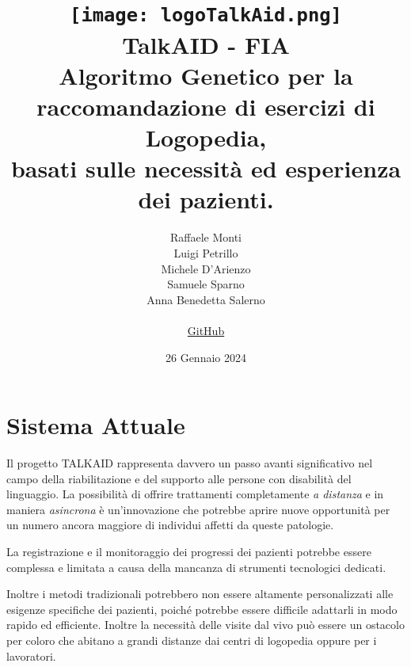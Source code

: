 \documentclass{article}
\begin{document}
    \title{
    \texttt{[image: logoTalkAid.png]} \\[1cm]
    \textbf{TalkAID - FIA}\\
    \vspace{0.5cm}
    \large Algoritmo Genetico per la raccomandazione di esercizi di Logopedia,\\
    basati sulle necessità ed esperienza dei pazienti.
}
    \author{
    Raffaele Monti\\
    Luigi Petrillo\\
    Michele D'Arienzo\\
     Samuele Sparno\\
    Anna Benedetta Salerno\\
    \vspace{0.5cm} 
    \\
    \href{https://github.com/r-monti/fia}{GitHub}
}
    \date{26 Gennaio 2024}

    \maketitle

    \pagebreak

    \tableofcontents

    \pagebreak
    
    \section{Sistema Attuale}

    Il progetto TALKAID rappresenta davvero un passo avanti significativo nel campo della riabilitazione e del supporto alle persone con disabilità del linguaggio. La possibilità di offrire trattamenti completamente \textit{a distanza} e in maniera \textit{asincrona} è un'innovazione che potrebbe aprire nuove opportunità per un numero ancora maggiore di individui affetti da queste patologie.

    La registrazione e il monitoraggio dei progressi dei pazienti potrebbe essere complessa e limitata a causa della mancanza di strumenti tecnologici dedicati.

    Inoltre i metodi tradizionali potrebbero non essere altamente personalizzati alle esigenze specifiche dei pazienti, poiché potrebbe essere difficile adattarli in modo rapido ed efficiente. Inoltre la necessità delle visite dal vivo può essere un ostacolo per coloro che abitano a grandi distanze dai centri di logopedia oppure per i lavoratori.
\end{document}
